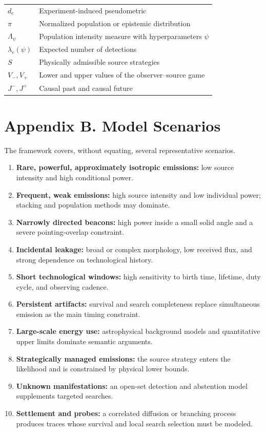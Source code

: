 \documentclass[11pt,a4paper]{article}
\begin{document}
\begin{longtable}[]{@{}Q{0.25\textwidth}Q{0.63\textwidth}@{}}
\(d_e\) & Experiment-induced pseudometric \\
\(\pi\) & Normalized population or epistemic distribution \\
\(\Lambda_\psi\) & Population intensity measure with hyperparameters \(\psi\) \\
\(\lambda_e(\psi)\) & Expected number of detections \\
\(S\) & Physically admissible source strategies \\
\(V_-,V_+\) & Lower and upper values of the observer--source game \\
\(J^-,J^+\) & Causal past and causal future \\
\end{longtable}

\section{Appendix B. Model Scenarios}\label{appendix-b-model-scenarios}

The framework covers, without equating, several representative scenarios.

\begin{enumerate}
\def\labelenumi{\arabic{enumi}.}
\item
  \textbf{Rare, powerful, approximately isotropic emissions:} low source intensity and high conditional power.
\item
  \textbf{Frequent, weak emissions:} high source intensity and low individual power; stacking and population methods may dominate.
\item
  \textbf{Narrowly directed beacons:} high power inside a small solid angle and a severe pointing-overlap constraint.
\item
  \textbf{Incidental leakage:} broad or complex morphology, low received flux, and strong dependence on technological history.
\item
  \textbf{Short technological windows:} high sensitivity to birth time, lifetime, duty cycle, and observing cadence.
\item
  \textbf{Persistent artifacts:} survival and search completeness replace simultaneous emission as the main timing constraint.
\item
  \textbf{Large-scale energy use:} astrophysical background models and quantitative upper limits dominate semantic arguments.
\item
  \textbf{Strategically managed emissions:} the source strategy enters the likelihood and is constrained by physical lower bounds.
\item
  \textbf{Unknown manifestations:} an open-set detection and abstention model supplements targeted searches.
\item
  \textbf{Settlement and probes:} a correlated diffusion or branching process produces traces whose survival and local search selection must be modeled.
\end{enumerate}
\end{document}
